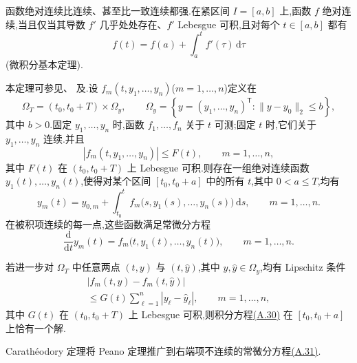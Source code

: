 \begin{note}[绝对连续函数]\label{note:appendix-a-49}
函数绝对连续比连续、甚至比一致连续都强.在紧区间 $I=[a,b]$ 上,函数 $f$ 绝对连续,当且仅当其导数 $f'$ 几乎处处存在、$f'$ Lebesgue 可积,且对每个 $t\in[a,b]$ 都有
\[
 f(t)=f(a)+\int_a^t f'(\tau)\,\mathrm d\tau
\]
(微积分基本定理).
\end{note}

\begin{theorem}\label{thm:appendix-a-50}
本定理可参见\textcite[第 11 章]{Caratheodory1918}、\textcite[第 34 页]{Kamke1944} 及\textcite[第 1.1 节]{Filippov1988}.设 $f_m(t,y_1,\ldots,y_n)$($m=1,\ldots,n$)定义在
\[
 \Omega_T=(t_0,t_0+T)\times\Omega_y,
 \qquad \Omega_y=\left\{y=(y_1,\ldots,y_n)^{\mathsf T}:\|y-y_0\|_2\le b\right\},
\]
其中 $b>0$.固定 $y_1,\ldots,y_n$ 时,函数 $f_1,\ldots,f_n$ 关于 $t$ 可测;固定 $t$ 时,它们关于 $y_1,\ldots,y_n$ 连续.并且
\[
 |f_m(t,y_1,\ldots,y_n)|\le F(t),\qquad m=1,\ldots,n,
\]
其中 $F(t)$ 在 $(t_0,t_0+T)$ 上 Lebesgue 可积.则存在一组绝对连续函数 $y_1(t),\ldots,y_n(t)$,使得对某个区间 $[t_0,t_0+a]$ 中的所有 $t$,其中 $0<a\le T$,均有
\begin{equation}\label{eq:appendix-a-30}
 y_m(t)=y_{0,m}+\int_{t_0}^t f_m\bigl(s,y_1(s),\ldots,y_n(s)\bigr)\,\mathrm ds,
 \qquad m=1,\ldots,n.
\end{equation}
在被积项连续的每一点,这些函数满足常微分方程
\begin{equation}\label{eq:appendix-a-31}
 \frac{\mathrm d}{\mathrm dt}y_m(t)=f_m\bigl(t,y_1(t),\ldots,y_n(t)\bigr),
 \qquad m=1,\ldots,n.
\end{equation}

若进一步对 $\Omega_T$ 中任意两点 $(t,y)$ 与 $(t,\widehat y)$,其中 $y,\widehat y\in\Omega_y$,均有 Lipschitz 条件
\[
 \begin{gathered}
 |f_m(t,y)-f_m(t,\widehat y)|\\
 \le G(t)\sum_{\ell=1}^n|y_\ell-\widehat y_\ell|,
 \qquad m=1,\ldots,n,
 \end{gathered}
\]
其中 $G(t)$ 在 $(t_0,t_0+T)$ 上 Lebesgue 可积,则积分方程\hyperref[eq:appendix-a-30]{(A.30)} 在 $[t_0,t_0+a]$ 上恰有一个解.
\end{theorem}

\begin{note}[Carathéodory 定理]\label{note:appendix-a-51}
Carathéodory 定理将 Peano 定理推广到右端项不连续的常微分方程\hyperref[eq:appendix-a-31]{(A.31)}.
\end{note}


